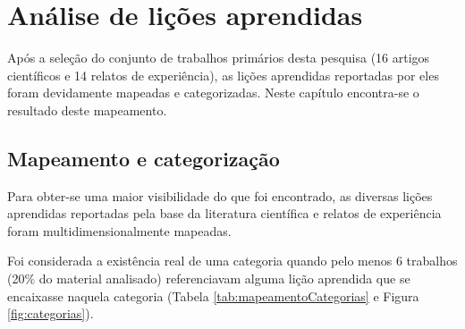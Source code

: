 \chapter{Análise de lições aprendidas}

Após a seleção do conjunto de trabalhos primários desta pesquisa (16 artigos científicos e 14 relatos de experiência), as lições aprendidas reportadas por eles foram devidamente mapeadas e categorizadas. Neste capítulo encontra-se o resultado deste mapeamento.

\section{Mapeamento e categorização}
Para obter-se uma maior visibilidade do que foi encontrado, as diversas lições aprendidas reportadas pela base da literatura científica e relatos de experiência foram multidimensionalmente mapeadas.

Foi considerada a existência real de uma categoria quando pelo menos 6 trabalhos (20\% do material analisado) referenciavam alguma lição aprendida que se encaixasse naquela categoria (Tabela \ref{tab:mapeamentoCategorias} e Figura \ref{fig:categorias}).

